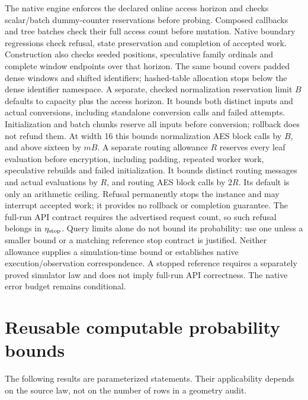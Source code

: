 \documentclass[11pt]{article}
\theoremstyle{definition}
\theoremstyle{remark}
\begin{document}
The native engine enforces the declared online access horizon and checks
scalar/batch dummy-counter reservations before probing. Composed callbacks and
tree batches check their full access count before mutation. Native boundary
regressions check refusal, state preservation and completion of accepted work.
Construction also checks seeded positions, speculative family ordinals and
complete window endpoints over that horizon. The same bound covers padded
dense windows and shifted identifiers; hashed-table allocation stops below
the dense identifier namespace. A separate, checked normalization reservation
limit $B$ defaults to capacity plus the access horizon. It bounds both distinct
inputs and actual conversions, including standalone conversion calls and failed
attempts. Initialization and batch chunks reserve all inputs before conversion;
rollback does not refund them. At width 16 this bounds normalization AES
block calls by $B$, and above sixteen by $mB$. A separate routing allowance $R$
reserves every leaf evaluation before encryption, including padding, repeated
worker work, speculative rebuilds and failed initialization. It bounds distinct
routing messages and actual evaluations by $R$, and routing AES block calls by
$2R$. Its default is only an arithmetic ceiling. Refusal permanently stops the
instance and may interrupt accepted work; it provides no rollback or completion
guarantee. The full-run API contract requires the advertised request count,
so such refusal belongs in $\eta_{\rm stop}$. Query limits alone do not bound
its probability: use one unless a smaller bound or a matching reference stop
contract is justified. Neither allowance supplies a simulation-time bound or
establishes native execution/observation correspondence. A stopped reference
requires a separately proved simulator law and does not imply full-run API
correctness. The native error
budget remains conditional.

\section{Reusable computable probability bounds}
The following results are parameterized statements. Their applicability
depends on the source law, not on the number of rows in a geometry audit.
\end{document}
